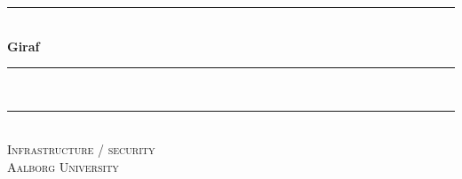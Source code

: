 \begin{titlingpage}

  \centering
  \rule{\linewidth}{0.2 mm} \\[0.5 cm]
  { \huge \bfseries Giraf}\\
  \rule{\linewidth}{0.2 mm} \\[2 cm]
  \rule{\linewidth}{0.2 mm} \\[0.3 cm]
  \textsc{\LARGE Infrastructure / security} \\[0.5 cm]
  \textsc{\large Aalborg University}\\[0.5 cm]
  {\Large \groupnumber}\\[0.5 cm]

\end{titlingpage}
